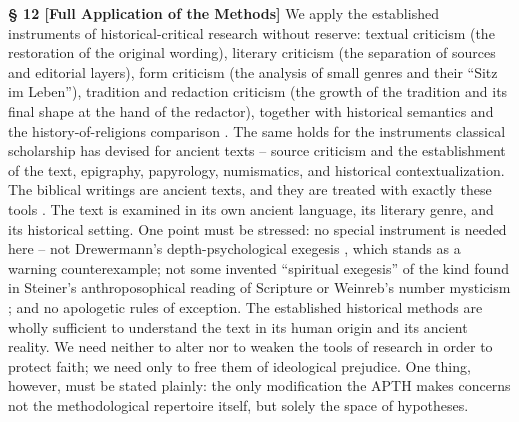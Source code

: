 \documentclass[11pt,a4paper]{article}
\makeatletter
\newcommand{\apth}{{\apthfont APTH}\hspace{0.15em}\xspace}
\newcommand{\apthsec}[3]{%
  \phantomsection%
  \def\@currentlabel{#1}%
  \label{sec:#3}%
  \textbf{§ #1 [#2]}%
}
\makeatother
\begin{document}
\apthsec{12}{Full Application of the Methods}{methodenanwendung} We apply the established instruments of historical-critical research without reserve: textual criticism (the restoration of the original wording), literary criticism (the separation of sources and editorial layers), form criticism (the analysis of small genres and their ``Sitz im Leben''), tradition and redaction criticism (the growth of the tradition and its final shape at the hand of the redactor), together with historical semantics and the history-of-religions comparison \citep{steck1999,schnelle2008,soeding1998}. The same holds for the instruments classical scholarship has devised for ancient texts -- source criticism and the establishment of the text, epigraphy, papyrology, numismatics, and historical contextualization. The biblical writings are ancient texts, and they are treated with exactly these tools \citep{schaps2011,bernheim1889}. The text is examined in its own ancient language, its literary genre, and its historical setting. One point must be stressed: no special instrument is needed here -- not Drewermann's depth-psychological exegesis \citeyearpar{drewermann1984}, which stands as a warning counterexample; not some invented ``spiritual exegesis'' of the kind found in Steiner's anthroposophical reading of Scripture \citeyearpar{steiner1910} or Weinreb's number mysticism \citeyearpar{weinreb1963}; and no apologetic rules of exception. The established historical methods are wholly sufficient to understand the text in its human origin and its ancient reality. We need neither to alter nor to weaken the tools of research in order to protect faith; we need only to free them of ideological prejudice. One thing, however, must be stated plainly: the only modification the \apth makes concerns not the methodological repertoire itself, but solely the space of hypotheses.
\end{document}
